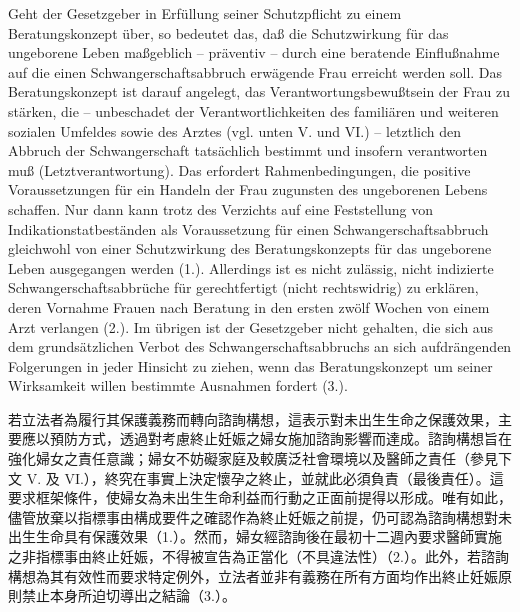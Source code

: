 \documentclass[12pt]{article}
\begin{document}
\begin{sourcepara}[title={原文D.83}]
Geht der Gesetzgeber in Erfüllung seiner Schutzpflicht zu einem Beratungskonzept über, so bedeutet das, daß die Schutzwirkung für das ungeborene Leben maßgeblich -- präventiv -- durch eine beratende Einflußnahme auf die einen Schwangerschaftsabbruch erwägende Frau erreicht werden soll. Das Beratungskonzept ist darauf angelegt, das Verantwortungsbewußtsein der Frau zu stärken, die -- unbeschadet der Verantwortlichkeiten des familiären und weiteren sozialen Umfeldes sowie des Arztes (vgl. unten V. und VI.) -- letztlich den Abbruch der Schwangerschaft tatsächlich bestimmt und insofern verantworten muß (Letztverantwortung). Das erfordert Rahmenbedingungen, die positive Voraussetzungen für ein Handeln der Frau zugunsten des ungeborenen Lebens schaffen. Nur dann kann trotz des Verzichts auf eine Feststellung von Indikationstatbeständen als Voraussetzung für einen Schwangerschaftsabbruch gleichwohl von einer Schutzwirkung des Beratungskonzepts für das ungeborene Leben ausgegangen werden (1.). Allerdings ist es nicht zulässig, nicht indizierte Schwangerschaftsabbrüche für gerechtfertigt (nicht rechtswidrig) zu erklären, deren Vornahme Frauen nach Beratung in den ersten zwölf Wochen von einem Arzt verlangen (2.). Im übrigen ist der Gesetzgeber nicht gehalten, die sich aus dem grundsätzlichen Verbot des Schwangerschaftsabbruchs an sich aufdrängenden Folgerungen in jeder Hinsicht zu ziehen, wenn das Beratungskonzept um seiner Wirksamkeit willen bestimmte Ausnahmen fordert (3.).
\end{sourcepara}
\begin{transpara}
若立法者為履行其保護義務而轉向諮詢構想，這表示對未出生生命之保護效果，主要應以預防方式，透過對考慮終止妊娠之婦女施加諮詢影響而達成。諮詢構想旨在強化婦女之責任意識；婦女不妨礙家庭及較廣泛社會環境以及醫師之責任（參見下文 V. 及 VI.），終究在事實上決定懷孕之終止，並就此必須負責（最後責任）。這要求框架條件，使婦女為未出生生命利益而行動之正面前提得以形成。唯有如此，儘管放棄以指標事由構成要件之確認作為終止妊娠之前提，仍可認為諮詢構想對未出生生命具有保護效果（1.）。然而，婦女經諮詢後在最初十二週內要求醫師實施之非指標事由終止妊娠，不得被宣告為正當化（不具違法性）（2.）。此外，若諮詢構想為其有效性而要求特定例外，立法者並非有義務在所有方面均作出終止妊娠原則禁止本身所迫切導出之結論（3.）。
\end{transpara}
\end{document}
